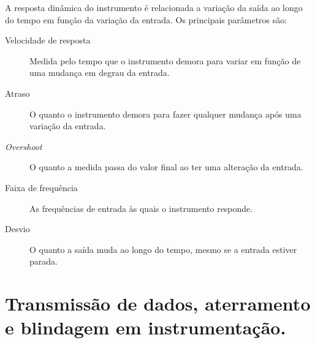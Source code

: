A resposta dinâmica do instrumento é relacionada a variação da saída ao longo do tempo em função da variação da entrada. Os principais parâmetros são:
\begin{description}
  \item[Velocidade de resposta] Medida pelo tempo que o instrumento demora para variar em função de uma mudança em degrau da entrada.
  \item[Atraso] O quanto o instrumento demora para fazer qualquer mudança após uma variação da entrada.
  \item[\emph{Overshoot}] O quanto a medida passa do valor final ao ter uma alteração da entrada.
  \item [Faixa de frequência] As frequências de entrada às quais o instrumento responde.
  \item[Desvio] O quanto a saída muda ao longo do tempo, mesmo se a entrada estiver parada.
\end{description}


\section{Transmissão de dados, aterramento e blindagem em instrumentação.}
